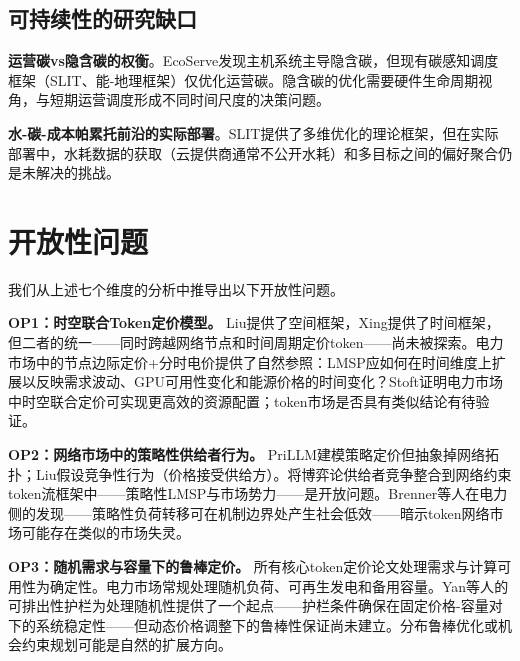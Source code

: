 \documentclass[11pt,twocolumn]{article}
\begin{document}
\subsection{可持续性的研究缺口}

\textbf{运营碳vs隐含碳的权衡}。EcoServe\cite{li2025ecoserve}发现主机系统主导隐含碳，但现有碳感知调度框架（SLIT\cite{moore2025slit}、能-地理框架\cite{luo2026aiinference}）仅优化运营碳。隐含碳的优化需要硬件生命周期视角，与短期运营调度形成不同时间尺度的决策问题。

\textbf{水-碳-成本帕累托前沿的实际部署}。SLIT\cite{moore2025slit}提供了多维优化的理论框架，但在实际部署中，水耗数据的获取（云提供商通常不公开水耗）和多目标之间的偏好聚合仍是未解决的挑战。

\section{开放性问题}

我们从上述七个维度的分析中推导出以下开放性问题。

\textbf{OP1：时空联合Token定价模型。} Liu\cite{liu2026locational}提供了空间框架，Xing\cite{xing2026tokenfutures}提供了时间框架，但二者的统一——同时跨越网络节点和时间周期定价token——尚未被探索。电力市场中的节点边际定价+分时电价提供了自然参照：LMSP应如何在时间维度上扩展以反映需求波动、GPU可用性变化和能源价格的时间变化？Stoft\cite{stofft2002power}证明电力市场中时空联合定价可实现更高效的资源配置；token市场是否具有类似结论有待验证。

\textbf{OP2：网络市场中的策略性供给者行为。} PriLLM\cite{guo2025prilm}建模策略定价但抽象掉网络拓扑；Liu\cite{liu2026locational}假设竞争性行为（价格接受供给方）。将博弈论供给者竞争整合到网络约束token流框架中——策略性LMSP与市场势力——是开放问题。Brenner等人\cite{brenner2026spatial,brenner2025strategic}在电力侧的发现——策略性负荷转移可在机制边界处产生社会低效——暗示token网络市场可能存在类似的市场失灵。

\textbf{OP3：随机需求与容量下的鲁棒定价。} 所有核心token定价论文\cite{liu2026locational,xing2026tokenfutures,guo2025prilm,zhong2026token}处理需求与计算可用性为确定性。电力市场常规处理随机负荷、可再生发电和备用容量。Yan等人\cite{yan2026stackelberg}的可排出性护栏为处理随机性提供了一个起点——护栏条件确保在固定价格-容量对下的系统稳定性——但动态价格调整下的鲁棒性保证尚未建立。分布鲁棒优化或机会约束规划可能是自然的扩展方向。
\end{document}
